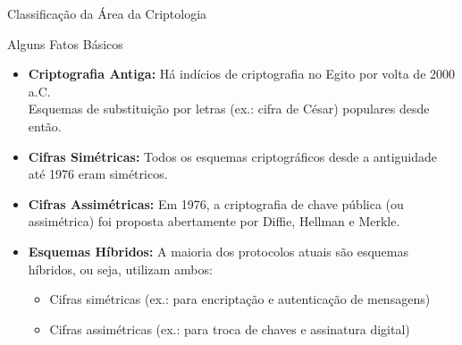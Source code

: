 \documentclass{beamer}
\begin{document}
\begin{frame}{Classificação da Área da Criptologia}
\centering
{}
\end{frame}


\begin{frame}{Alguns Fatos Básicos}
\begin{itemize}
    \item \textbf{Criptografia Antiga:} Há indícios de criptografia no Egito por volta de 2000 a.C.\\
    Esquemas de substituição por letras (ex.: cifra de César) populares desde então.
    
    \item \textbf{Cifras Simétricas:} Todos os esquemas criptográficos desde a antiguidade até 1976 eram simétricos.

    \item \textbf{Cifras Assimétricas:} Em 1976, a criptografia de chave pública (ou assimétrica) foi proposta abertamente por Diffie, Hellman e Merkle.

    \item \textbf{Esquemas Híbridos:} A maioria dos protocolos atuais são esquemas híbridos, ou seja, utilizam ambos:
    \begin{itemize}
        \item Cifras simétricas (ex.: para encriptação e autenticação de mensagens)
        \item Cifras assimétricas (ex.: para troca de chaves e assinatura digital)
    \end{itemize}
\end{itemize}
\end{frame}
\end{document}
